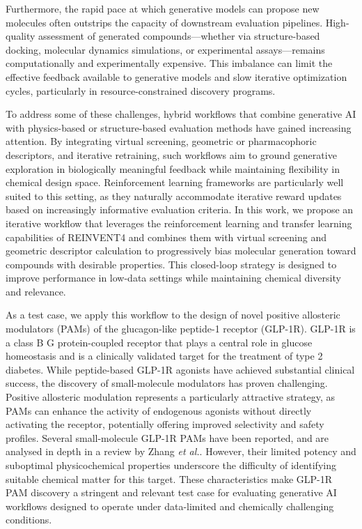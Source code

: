 \documentclass[letterpaper]{article}
\begin{document}
Furthermore, the rapid pace at which generative models can propose new molecules often outstrips the capacity of downstream evaluation pipelines. High-quality assessment of generated compounds—whether via structure-based docking, molecular dynamics simulations, or experimental assays—remains computationally and experimentally expensive. This imbalance can limit the effective feedback available to generative models and slow iterative optimization cycles, particularly in resource-constrained discovery programs.

To address some of these challenges, hybrid workflows that combine generative AI with physics-based or structure-based evaluation methods have gained increasing attention. By integrating virtual screening, geometric or pharmacophoric descriptors, and iterative retraining, such workflows aim to ground generative exploration in biologically meaningful feedback while maintaining flexibility in chemical design space. Reinforcement learning frameworks are particularly well suited to this setting, as they naturally accommodate iterative reward updates based on increasingly informative evaluation criteria. In this work, we propose an iterative workflow that leverages the reinforcement learning and transfer learning capabilities of REINVENT4 and combines them with virtual screening and geometric descriptor calculation to progressively bias molecular generation toward compounds with desirable properties. This closed-loop strategy is designed to improve performance in low-data settings while maintaining chemical diversity and relevance.

As a test case, we apply this workflow to the design of novel positive allosteric modulators (PAMs) of the glucagon-like peptide-1 receptor (GLP-1R). GLP-1R is a class B G protein-coupled receptor that plays a central role in glucose homeostasis and is a clinically validated target for the treatment of type 2 diabetes\cite{Perfetti2000Glucagon-likeFunction}. While peptide-based GLP-1R agonists have achieved substantial clinical success, the discovery of small-molecule modulators has proven challenging. Positive allosteric modulation represents a particularly attractive strategy, as PAMs can enhance the activity of endogenous agonists without directly activating the receptor, potentially offering improved selectivity and safety profiles. Several small-molecule GLP-1R PAMs have been reported, and are analysed in depth in a review by Zhang \textit{et al.}\cite{Zhang2024BindingAgonists}. However, their limited potency and suboptimal physicochemical properties underscore the difficulty of identifying suitable chemical matter for this target\cite{Wang2021AllostericSite}. These characteristics make GLP-1R PAM discovery a stringent and relevant test case for evaluating generative AI workflows designed to operate under data-limited and chemically challenging conditions.
\end{document}
